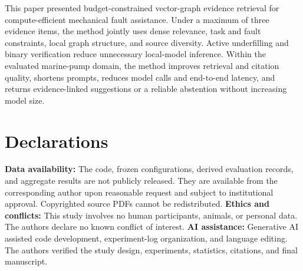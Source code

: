 \documentclass[conference]{IEEEtran}
\begin{document}
This paper presented budget-constrained vector-graph evidence retrieval for compute-efficient mechanical fault assistance. Under a maximum of three evidence items, the method jointly uses dense relevance, task and fault constraints, local graph structure, and source diversity. Active underfilling and binary verification reduce unnecessary local-model inference. Within the evaluated marine-pump domain, the method improves retrieval and citation quality, shortens prompts, reduces model calls and end-to-end latency, and returns evidence-linked suggestions or a reliable abstention without increasing model size.

\section*{Declarations}
\textbf{Data availability:} The code, frozen configurations, derived evaluation records, and aggregate results are not publicly released. They are available from the corresponding author upon reasonable request and subject to institutional approval. Copyrighted source PDFs cannot be redistributed. \textbf{Ethics and conflicts:} This study involves no human participants, animals, or personal data. The authors declare no known conflict of interest. \textbf{AI assistance:} Generative AI assisted code development, experiment-log organization, and language editing. The authors verified the study design, experiments, statistics, citations, and final manuscript.
\end{document}
